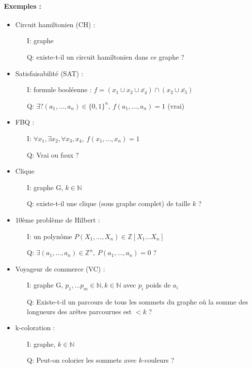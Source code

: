 \documentclass[12pt,a4paper]{report}
\begin{document}
\paragraph{Exemples :}
\begin{itemize}
\item Circuit hamiltonien (CH) :
\begin{itemize}
\item[I:] graphe
\item[Q:] existe-t-il un circuit hamiltonien dans ce graphe ?
\end{itemize}
\item Satisfaisabilité  (SAT) : 
\begin{itemize}
\item[I:] formule booléenne : $f=(x_1 \cup x_2 \cup \bar{x_4} ) \cap (x_2 \cup \bar{x_5})$
\item[Q:] $\exists ? (a_1,\ldots,a_n) \in \{0,1\}^n,\ f(a_1,\ldots, a_n)= 1$ (vrai)
\end{itemize}
\item FBQ :
\begin{itemize}
\item[I:] $\forall x_1, \exists x_2, \forall x_3,x_4,\ f(x_1,\ldots,x_n)= 1$
\item[Q:] Vrai ou faux ?
\end{itemize}
\item Clique
\begin{itemize}
\item[I:] graphe G, $k \in \mathbb{N}$
\item[Q:] existe-t-il une clique (sous graphe complet) de taille $k$  ?
\end{itemize}
\item 10ème problème de Hilbert :
\begin{itemize}
\item[I:] un polynôme $P(X_1,\ldots,X_n) \in \mathbb{Z}[X_1\ldots X_n]$
\item[Q:] $ \exists (a_1,\ldots,a_n) \in \mathbb{Z}^n,\ P(a_1,\ldots,a_n) = 0$ ?
\end{itemize}
\item Voyageur de commerce (VC) :
\begin{itemize}
\item[I:] graphe G, $p_1,\ldots p_m \in \mathbb{N}, k \in \mathbb{N}$ avec $p_i$ poids de $a_i$
\item[Q:] Existe-t-il un parcours de tous les sommets du graphe où la somme des longueurs des arêtes parcourues est $<k$ ?
\end{itemize}
\item k-coloration :
\begin{itemize}
\item[I:] graphe, $k\in \mathbb{N}$
\item[Q:] Peut-on colorier les sommets avec $k$-couleurs ?
\end{itemize}
\end{itemize}
\end{document}
